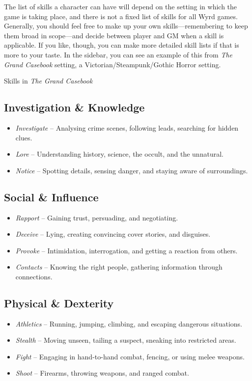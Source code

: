 The list of skills a character can have will depend on the setting in which the game is taking place, and there is not a fixed list of skills for all Wyrd games. Generally, you should feel free to make up your own skills---remembering to keep them broad in scope---and decide between player and GM when a skill is applicable. If you like, though, you can make more detailed skill lists if that is more to your taste. In the sidebar, you can see an example of this from \emph{The Grand Casebook} setting, a Victorian/Steampunk/Gothic Horror setting.

\begin{DndSidebar}[float=!b]{Skills in \emph{The Grand Casebook}}
\subsection*{Investigation \& Knowledge}  
\begin{itemize}
    \item \emph{Investigate} – Analysing crime scenes, following leads, searching for hidden clues.
    \item \emph{Lore} – Understanding history, science, the occult, and the unnatural.
    \item \emph{Notice} – Spotting details, sensing danger, and staying aware of surroundings.
\end{itemize}

\subsection*{Social \& Influence}  
\begin{itemize}
    \item \emph{Rapport} – Gaining trust, persuading, and negotiating.
    \item \emph{Deceive} – Lying, creating convincing cover stories, and disguises.
    \item \emph{Provoke} – Intimidation, interrogation, and getting a reaction from others.
    \item \emph{Contacts} – Knowing the right people, gathering information through connections.
\end{itemize}

\subsection*{Physical \& Dexterity}  
\begin{itemize}
    \item \emph{Athletics} – Running, jumping, climbing, and escaping dangerous situations.
    \item \emph{Stealth} – Moving unseen, tailing a suspect, sneaking into restricted areas.
    \item \emph{Fight} – Engaging in hand-to-hand combat, fencing, or using melee weapons.
    \item \emph{Shoot} – Firearms, throwing weapons, and ranged combat.
\end{itemize}


\end{DndSidebar}
